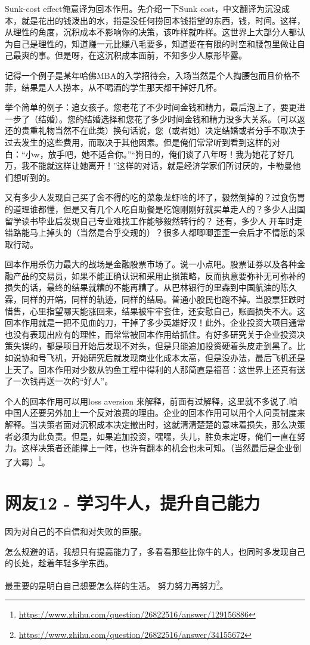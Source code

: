Sunk-cost effect俺意译为回本作用。先介绍一下Sunk cost，中文翻译为沉没成本，就是花出的钱泼出的水，指是没任何捞回本钱指望的东西，钱，时间。这样，从理性的角度，沉积成本不影响你的决策，该咋样就咋样。这世界上大部分人都认为自己是理性的，知道赚一元比赚八毛要多，知道要在有限的时空和腰包里做让自己最爽的事。但是呀，在这沉积成本面前，不知多少人原形毕露。

记得一个例子是某年哈佛MBA的入学招待会，入场当然是个人掏腰包而且价格不菲，结果是人人捞本，从不喝酒的学生那天都干掉好几杯。

举个简单的例子：追女孩子。您老花了不少时间金钱和精力，最后泡上了，要更进一步了（结婚）。您的结婚选择和您花了多少时间金钱和精力没多大关系。（可以返还的贵重礼物当然不在此类）换句话说，您（或者她）决定结婚或者分手不取决于过去发生的这些费用，而取决于其他因素。但是俺们常常听到看到这样的对白：“小w，放手吧，她不适合你。”“狗日的，俺们谈了八年呀！我为她花了好几万，我不能就这样让她离开！”这样的对话，就是经济学家们所讨厌的，卡勒曼他们想听到的。

又有多少人发现自己买了舍不得的吃的菜象龙虾啥的坏了，毅然倒掉的？过食伤胃的道理谁都懂，但是又有几个人吃自助餐是吃饱刚刚好就买单走人的？多少人出国留学读书毕业后发现自己专业难找工作能够毅然转行的？ 还有，多少人 开车时走错路能马上掉头的（当然是合乎交规的）？很多人都唧唧歪歪一会后才不情愿的采取行动。

回本作用杀伤力最大的战场是金融股票市场了。说一小点吧。股票证券以及各种金融产品的交易员，如果不能正确认识和采用止损策略，反而执意要弥补无可弥补的损失的话，最终的结果就糟的不能再糟了。从巴林银行的里森到中国航油的陈久霖，同样的开端，同样的轨迹，同样的结局。普通小股民也跑不掉。当股票狂跌时惜售，心里指望哪天能涨回来，结果被牢牢套住，还安慰自己，账面损失不大。这回本作用就是一把不见血的刀，干掉了多少英雄好汉！此外，企业投资大项目通常也没有表现出应有的理性，而常常被回本作用给抓住。有好多研究关于企业投资决策失误的，都是项目开始后发现不对头，但是只能追加投资硬着头皮走到黑了。比如说协和号飞机，开始研究后就发现商业化成本太高，但是没办法，最后飞机还是上天了。回本作用对少数从钓鱼工程中得利的人那简直是福音：这世界上还真有送了一次钱再送一次的“好人”。

个人的回本作用可以用loss aversion 来解释，前面有过解释，这里就不多说了.咱中国人还要另外加上一个反对浪费的理由。企业的回本作用可以用个人问责制度来解释。当决策者面对沉积成本决定撤出时，这就清清楚楚的意味着损失，那么决策者必须为此负责。但是，如果追加投资，嘿嘿，头儿，胜负未定呀，俺们一直在努力。这样决策者还能撑上一阵，也许有翻本的机会也未可知。（当然最后是企业倒了大霉）\footnote{\url{https://www.zhihu.com/question/26822516/answer/129156886}}。

\section{网友12 - 学习牛人，提升自己能力}

因为对自己的不自信和对失败的臣服。

怎么规避的话，我想只有提高能力了，多看看那些比你牛的人，也同时多发现自己的长处，趁着年轻多学东西。

最重要的是明白自己想要怎么样的生活。
努力努力再努力\footnote{\url{https://www.zhihu.com/question/26822516/answer/34155672}}。


